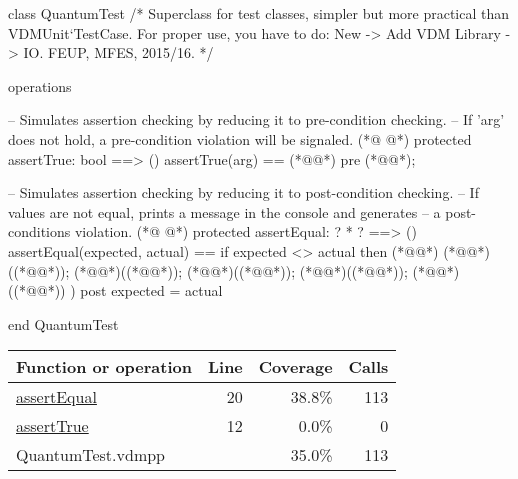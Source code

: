 \begin{vdmpp}[breaklines=true]
class QuantumTest
/*
  Superclass for test classes, simpler but more practical than VDMUnit`TestCase. 
  For proper use, you have to do: New -> Add VDM Library -> IO.
  FEUP, MFES, 2015/16.
*/

operations

 -- Simulates assertion checking by reducing it to pre-condition checking.
 -- If 'arg' does not hold, a pre-condition violation will be signaled.
(*@
\label{assertTrue:12}
@*)
 protected assertTrue: bool ==> ()
 assertTrue(arg) == 
  (*@@*) 
 pre (*@@*);
  
 -- Simulates assertion checking by reducing it to post-condition checking.
 -- If values are not equal, prints a message in the console and generates 
 -- a post-conditions violation.
(*@
\label{assertEqual:20}
@*)
 protected assertEqual: ? * ? ==> ()
 assertEqual(expected, actual) == 
  if expected <> actual then (*@\vdmnotcovered{(}@*)
    (*@@*)((*@@*));
    (*@@*)((*@@*)); 
    (*@@*)((*@@*));
    (*@@*)((*@@*));
    (*@@*)((*@@*))
  )
 post expected = actual
  
end QuantumTest
\end{vdmpp}
\bigskip
\begin{longtable}{|l|r|r|r|}
\hline
Function or operation & Line & Coverage & Calls \\
\hline
\hline
\hyperref[assertEqual:20]{assertEqual} & 20&38.8\% & 113 \\
\hline
\hyperref[assertTrue:12]{assertTrue} & 12&0.0\% & 0 \\
\hline
\hline
QuantumTest.vdmpp & & 35.0\% & 113 \\
\hline
\end{longtable}

